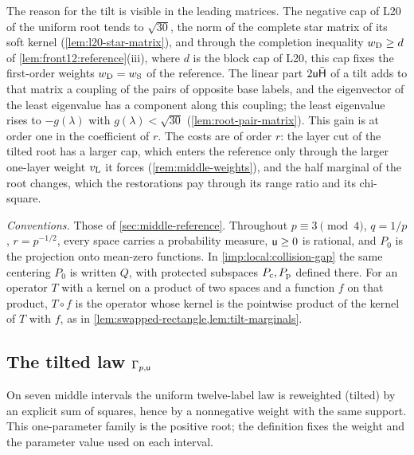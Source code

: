 The reason for the tilt is visible in the leading matrices. The negative cap of L20 of
the uniform root tends to $\sqrt{30}$, the norm of the complete star matrix of its soft
kernel (\cref{lem:l20-star-matrix}), and through the completion inequality
$w_{\rm D}\ge d$ of \cref{lem:front12:reference}(iii), where $d$ is the block cap
of L20, this cap fixes the first-order weights $w_{\rm D}=w_{\rm S}$ of the
reference. The linear part $2\mathsf u\bar{\mathsf H}$ of a tilt adds to that matrix a coupling of the
pairs of opposite base labels, and the eigenvector of the least eigenvalue has a component along
this coupling; the least eigenvalue rises to $-g(\lambda)$ with $g(\lambda)<\sqrt{30}$
(\cref{lem:root-pair-matrix}). This gain is at order one in the coefficient of $r$. The
costs are of order $r$: the layer cut of the tilted root has a larger cap,
which enters the reference only through the larger one-layer weight $v_{\rm L}$
it forces (\cref{rem:middle-weights}), and the half marginal of the root changes,
which the restorations pay through its range ratio and its chi-square.

\emph{Conventions.} Those of \cref{sec:middle-reference}. Throughout $p\equiv3\pmod4$,
$q=1/p$, $r=p^{-1/2}$, every space carries a probability measure, $\mathsf u\ge0$ is
rational, and $P_0$ is the projection onto mean-zero functions.
In \cref{imp:local:collision-gap} the same centering $P_0$ is written $Q$,
with protected subspaces $P_{\rm c},P_{\rm p}$ defined there. For an operator $T$ with
a kernel on a product of two spaces and a function $f$ on that product, $T\circ f$ is the
operator whose kernel is the pointwise product of the kernel of $T$ with $f$, as in
\cref{lem:swapped-rectangle,lem:tilt-marginals}.

\subsection{The tilted law \texorpdfstring{$\Gamma_{p,\mathsf u}$}{Gamma\_(p,u)}}\label{subsec:positive-root-law}

On seven middle intervals the uniform twelve-label law is
reweighted (tilted) by an explicit sum of squares, hence by a
nonnegative weight with the same support. This one-parameter
family is the positive root; the definition fixes the weight and
the parameter value used on each interval.

